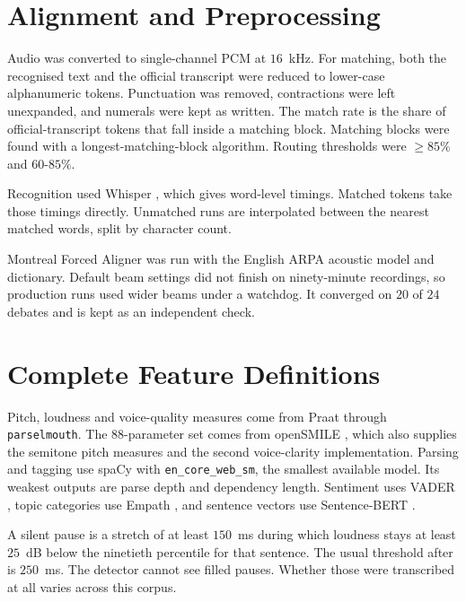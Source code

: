 \documentclass[pdflatex,sn-apa]{sn-jnl}%
\begin{document}
\normalsize

\section{Alignment and Preprocessing}
\label{s:align}

Audio was converted to single-channel PCM at $16$~kHz. For matching, both the
recognised text and the official transcript were reduced to lower-case
alphanumeric tokens. Punctuation was removed, contractions were left
unexpanded, and numerals were kept as written. The match rate is the share
of official-transcript tokens that fall inside a matching block. Matching
blocks were found with a longest-matching-block algorithm. Routing
thresholds were $\geq 85\%$ and $60$-$85\%$.

Recognition used Whisper \citep{radford2023whisper}, which gives word-level
timings. Matched tokens take those timings directly. Unmatched runs are
interpolated between the nearest matched words, split by character count.

Montreal Forced Aligner \citep{mcauliffe2017mfa} was run with the English ARPA
acoustic model and dictionary. Default beam settings did not finish on
ninety-minute recordings, so production runs used wider beams under a
watchdog. It converged on $20$ of $24$ debates and is kept as an independent
check.

\section{Complete Feature Definitions}
\label{s:features}

Pitch, loudness and voice-quality measures come from Praat
\citep{boersma2024praat} through \texttt{parselmouth}. The $88$-parameter set
comes from openSMILE \citep{eyben2010opensmile,eyben2016gemaps}, which also
supplies the semitone pitch measures and the second voice-clarity
implementation. Parsing and tagging use spaCy \citep{honnibal2020spacy} with
\texttt{en\_core\_web\_sm}, the smallest available model. Its weakest
outputs are parse depth and dependency length. Sentiment uses VADER
\citep{hutto2014vader}, topic categories use Empath \citep{fast2016empath}, and
sentence vectors use Sentence-BERT \citep{reimers2019sbert}.

A silent pause is a stretch of at least $150$~ms during which loudness stays
at least $25$~dB below the ninetieth percentile for that sentence. The usual
threshold after \citet{goldman1968psycholinguistics} is
$250$~ms. The detector cannot see filled pauses. Whether those were
transcribed at all varies across this corpus.
\end{document}
